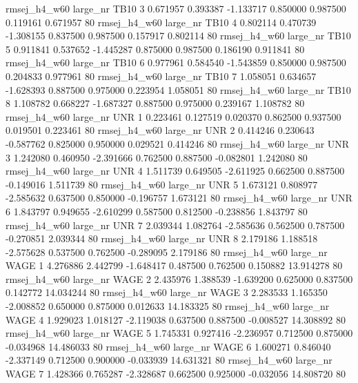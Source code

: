 rmsej_h4_w60   large_nr     TB10                 3  0.671957  0.393387  -1.133717 0.850000 0.987500  0.119161    0.671957 80
rmsej_h4_w60   large_nr     TB10                 4  0.802114  0.470739  -1.308155 0.837500 0.987500  0.157917    0.802114 80
rmsej_h4_w60   large_nr     TB10                 5  0.911841  0.537652  -1.445287 0.875000 0.987500  0.186190    0.911841 80
rmsej_h4_w60   large_nr     TB10                 6  0.977961  0.584540  -1.543859 0.850000 0.987500  0.204833    0.977961 80
rmsej_h4_w60   large_nr     TB10                 7  1.058051  0.634657  -1.628393 0.887500 0.975000  0.223954    1.058051 80
rmsej_h4_w60   large_nr     TB10                 8  1.108782  0.668227  -1.687327 0.887500 0.975000  0.239167    1.108782 80
rmsej_h4_w60   large_nr      UNR                 1  0.223461  0.127519   0.020370 0.862500 0.937500  0.019501    0.223461 80
rmsej_h4_w60   large_nr      UNR                 2  0.414246  0.230643  -0.587762 0.825000 0.950000  0.029521    0.414246 80
rmsej_h4_w60   large_nr      UNR                 3  1.242080  0.460950  -2.391666 0.762500 0.887500 -0.082801    1.242080 80
rmsej_h4_w60   large_nr      UNR                 4  1.511739  0.649505  -2.611925 0.662500 0.887500 -0.149016    1.511739 80
rmsej_h4_w60   large_nr      UNR                 5  1.673121  0.808977  -2.585632 0.637500 0.850000 -0.196757    1.673121 80
rmsej_h4_w60   large_nr      UNR                 6  1.843797  0.949655  -2.610299 0.587500 0.812500 -0.238856    1.843797 80
rmsej_h4_w60   large_nr      UNR                 7  2.039344  1.082764  -2.585636 0.562500 0.787500 -0.270851    2.039344 80
rmsej_h4_w60   large_nr      UNR                 8  2.179186  1.188518  -2.575628 0.537500 0.762500 -0.289095    2.179186 80
rmsej_h4_w60   large_nr     WAGE                 1  4.276886  2.442799  -1.648417 0.487500 0.762500  0.150882   13.914278 80
rmsej_h4_w60   large_nr     WAGE                 2  2.435976  1.388539  -1.639200 0.625000 0.837500  0.142772   14.034244 80
rmsej_h4_w60   large_nr     WAGE                 3  2.283533  1.165350  -2.008852 0.650000 0.875000  0.012633   14.183325 80
rmsej_h4_w60   large_nr     WAGE                 4  1.929023  1.018127  -2.119038 0.637500 0.887500 -0.008527   14.308892 80
rmsej_h4_w60   large_nr     WAGE                 5  1.745331  0.927416  -2.236957 0.712500 0.875000 -0.034968   14.486033 80
rmsej_h4_w60   large_nr     WAGE                 6  1.600271  0.846040  -2.337149 0.712500 0.900000 -0.033939   14.631321 80
rmsej_h4_w60   large_nr     WAGE                 7  1.428366  0.765287  -2.328687 0.662500 0.925000 -0.032056   14.808720 80

